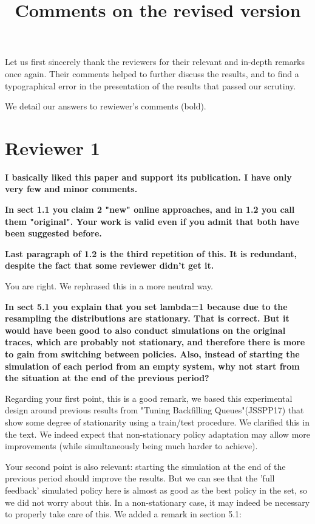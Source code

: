 \documentclass[]{article}
\title{Comments on the revised version}
\begin{document}
\maketitle

Let us first sincerely thank the reviewers for their relevant and in-depth
remarks once again. Their comments helped to further discuss the results, and
to find a typographical error in the presentation of the results that passed
our scrutiny.

We detail our answers to rewiewer's comments (bold).

\section{Reviewer 1}

\textbf{
  I basically liked this paper and support its publication.  I have only very few and minor comments.}

\textbf{In sect 1.1 you claim 2 "new" online approaches, and in 1.2 you call them "original". Your work is valid even if you
admit that both have been suggested before.
}

\textbf{Last paragraph of 1.2 is the third repetition of this.  It is redundant, despite the fact that some reviewer didn't get
it.
}

You are right. We rephrased this in a more neutral way.

\medskip

\textbf{In sect 5.1 you explain that you set lambda=1 because due to the resampling the distributions are stationary.  That is
correct.  But it would have been good to also conduct simulations on the original traces, which are probably not
stationary, and therefore there is more to gain from switching between policies.
Also, instead of starting the simulation of each period from an empty system, why not start from the situation at the
end of the previous period?
}

Regarding your first point, this is a good remark, we based this experimental
design around previous results from "Tuning Backfilling Queues"(JSSPP17) that
show some degree of stationarity using a train/test procedure. We clarified
this in the text.
We indeed expect that non-stationary policy adaptation may
allow more improvements (while simultaneously being much harder to achieve).

Your second point is also relevant: starting the simulation at the end of the previous
period should improve the results.
But we can see that the 'full feedback' simulated policy here is almost as good as the best
policy in the set, so we did not worry about this. In a non-stationary case, it may indeed
be necessary to properly take care of this. We added a remark in section 5.1:
\end{document}

